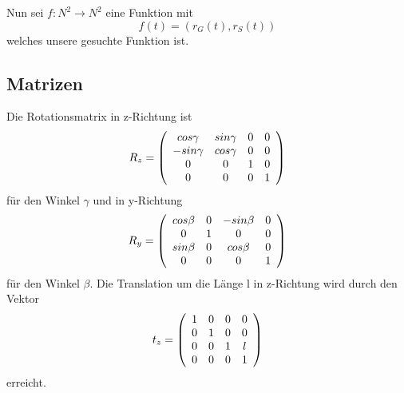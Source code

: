 \documentclass[a4paper,12pt]{article}
\begin{document}
Nun sei $f: N^2 \rightarrow N^2$ eine Funktion mit
$$f(t) = (r_{G}(t), r_{S}(t))$$
welches unsere gesuchte Funktion ist.

\subsection{Matrizen}
Die Rotationsmatrix in z-Richtung ist
\begin{equation}
R_{z} = \left(\begin{array}{ c c c c }
cos \gamma & sin \gamma & 0 & 0 \\
-sin \gamma & cos \gamma & 0 & 0 \\
0 & 0 & 1 & 0 \\
0 & 0 & 0 & 1
\end{array} \right)
\end{equation}
für den Winkel $\gamma$ und in y-Richtung
\begin{equation}
R_{y} = \left(\begin{array}{ c c c c }
cos \beta & 0 & -sin \beta & 0 \\
0 & 1 & 0 & 0 \\
sin \beta & 0 & cos \beta & 0 \\
0 & 0 & 0 & 1
\end{array} \right)
\end{equation}
für den Winkel $\beta$. Die Translation um die Länge l in
z-Richtung wird durch den Vektor
\begin{equation}
t_{z} = \left(\begin{array}{ c c c c }
1 & 0 & 0 & 0 \\
0 & 1 & 0 & 0 \\
0 & 0 & 1 & l \\
0 & 0 & 0 & 1
\end{array}\right)
\end{equation}
erreicht.
\end{document}
